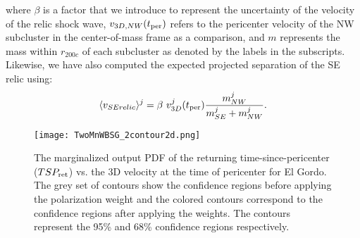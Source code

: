 \documentclass[ucdthesis.tex]{subfiles}
\begin{document}
    where  $\beta$ is a factor that we introduce to represent the
    uncertainty of the velocity of the relic shock wave, $v_{3D, NW}(t_{\rm per})$ 
    refers to the pericenter velocity of
    the NW subcluster in the center-of-mass frame as a comparison, and $m$
    represents the mass within $r_{200c}$ of each subcluster as denoted by the
    labels in the subscripts. 
    Likewise, we have also computed the expected projected separation of the SE
    relic using:  
    \begin{equation}
    	\label{eqn:SE_speed}
    	\langle v_{SE relic} \rangle^j = \beta~v^j_{3D}(t_{\rm per}) \frac{m^j_{NW}}{m^j_{SE} + m^j_{NW}}. 
    \end{equation}
    \par 
    \begin{figure}
    	\texttt{[image: TwoMnWBSG\_2contour2d.png]}
    	\caption{The marginalized output PDF of the returning time-since-pericenter
    ($TSP_{\rm ret}$) vs. the 3D velocity at the time of pericenter for El Gordo. The
    grey set of contours show the confidence regions before applying the
    polarization weight and the colored contours correspond to the confidence
    regions after applying the weights. The contours represent the 95\% and
    68\% confidence regions respectively. }
    	\label{fig:TSP_v3D}
    \end{figure}
\end{document}
